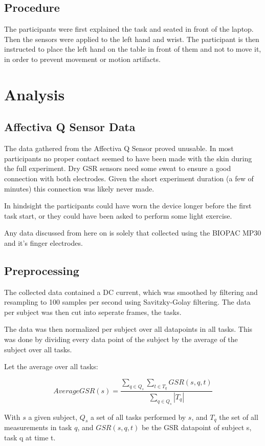 \documentclass[12pt,leqno,letterpaper]{report} %
\begin{document}
\subsection{Procedure}
The participants were first explained the task and seated in front of the laptop. Then the sensors were applied to the left hand and wrist. The participant is then instructed to place the left hand on the table in front of them and not to move it, in order to prevent movement or motion artifacts.

\section{Analysis}

\subsection{Affectiva Q Sensor Data}
The data gathered from the Affectiva Q Sensor proved unusable. In most participants no proper contact seemed to have been made with the skin during the full experiment. Dry GSR sensors need some sweat to ensure a good connection with both electrodes. Given the short experiment duration (a few of minutes) this connection was likely never made.

In hindsight the participants could have worn the device longer before the first task start, or they could have been asked to perform some light exercise. 

Any data discussed from here on is solely that collected using the BIOPAC MP30 and it's finger electrodes.


\subsection{Preprocessing}
The collected data contained a DC current, which was smoothed by filtering and resampling to 100 samples per second using Savitzky-Golay filtering. 
The data per subject was then cut into seperate frames, the tasks. 

The data was then normalized per subject over all datapoints in all tasks. This was done by dividing every data point of the subject by the average of the subject over all tasks. 

Let the average over all tasks:


\[
AverageGSR(s) = \frac 
{\sum_{q \in Q_s}\sum_{t \in T_q} GSR(s,q,t)}
{ \sum_{q \in Q_s} \left\vert{T_q}\right\vert }
\]

With $s$ a given subject, $Q_s$ a set of all tasks performed by $s$, and $T_q$ the set of all measurements in task $q$, and $GSR(s,q,t)$ be the GSR datapoint of subject s, task q at time t.
\end{document}
